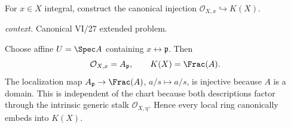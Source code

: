 \begin{problem}\label{prob:vi27-p10}
For \(x\in X\) integral, construct the canonical injection \(\mathcal O_{X,x}\hookrightarrow K(X)\).
\par\smallskip\noindent\textit{context.} Canonical VI/27 extended problem.
\end{problem}

\ifdefined\FullProblemDossiers
\begin{solution}
Choose affine \(U=\Spec A\) containing \(x\leftrightarrow\mathfrak p\). Then
\[
\mathcal O_{X,x}=A_{\mathfrak p},
\qquad
K(X)=\Frac(A).
\]
The localization map \(A_{\mathfrak p}\to\Frac(A)\), \(a/s\mapsto a/s\), is injective because \(A\) is a
domain. This is independent of the chart because both descriptions factor through the intrinsic generic stalk
\(\mathcal O_{X,\eta}\). Hence every local ring canonically embeds into \(K(X)\).
\end{solution}
\fi
